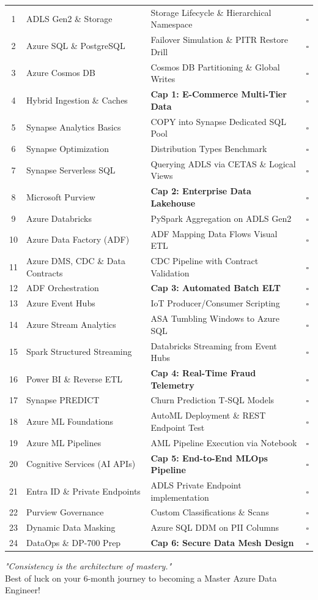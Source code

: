 \documentclass[11pt, a4paper]{article}
\begin{document}
\begin{center}
\begin{longtable}{@{} c l p{7cm} c @{}}
1 & ADLS Gen2 \& Storage & Storage Lifecycle \& Hierarchical Namespace & $\square$ \\
2 & Azure SQL \& PostgreSQL & Failover Simulation \& PITR Restore Drill & $\square$ \\
3 & Azure Cosmos DB & Cosmos DB Partitioning \& Global Writes & $\square$ \\
4 & Hybrid Ingestion \& Caches & \textbf{Cap 1: E-Commerce Multi-Tier Data} & $\square$ \\
\midrule
5 & Synapse Analytics Basics & COPY into Synapse Dedicated SQL Pool & $\square$ \\
6 & Synapse Optimization & Distribution Types Benchmark & $\square$ \\
7 & Synapse Serverless SQL & Querying ADLS via CETAS \& Logical Views & $\square$ \\
8 & Microsoft Purview & \textbf{Cap 2: Enterprise Data Lakehouse} & $\square$ \\
\midrule
9 & Azure Databricks & PySpark Aggregation on ADLS Gen2 & $\square$ \\
10 & Azure Data Factory (ADF) & ADF Mapping Data Flows Visual ETL & $\square$ \\
11 & Azure DMS, CDC \& Data Contracts & CDC Pipeline with Contract Validation & $\square$ \\
12 & ADF Orchestration & \textbf{Cap 3: Automated Batch ELT} & $\square$ \\
\midrule
13 & Azure Event Hubs & IoT Producer/Consumer Scripting & $\square$ \\
14 & Azure Stream Analytics & ASA Tumbling Windows to Azure SQL & $\square$ \\
15 & Spark Structured Streaming & Databricks Streaming from Event Hubs & $\square$ \\
16 & Power BI \& Reverse ETL & \textbf{Cap 4: Real-Time Fraud Telemetry} & $\square$ \\
\midrule
17 & Synapse PREDICT & Churn Prediction T-SQL Models & $\square$ \\
18 & Azure ML Foundations & AutoML Deployment \& REST Endpoint Test & $\square$ \\
19 & Azure ML Pipelines & AML Pipeline Execution via Notebook & $\square$ \\
20 & Cognitive Services (AI APIs)& \textbf{Cap 5: End-to-End MLOps Pipeline} & $\square$ \\
\midrule
21 & Entra ID \& Private Endpoints& ADLS Private Endpoint implementation & $\square$ \\
22 & Purview Governance & Custom Classifications \& Scans & $\square$ \\
23 & Dynamic Data Masking & Azure SQL DDM on PII Columns & $\square$ \\
24 & DataOps \& DP-700 Prep & \textbf{Cap 6: Secure Data Mesh Design} & $\square$ \\

\end{longtable}
\end{center}

\vspace{1cm}
\begin{center}
    \textit{"Consistency is the architecture of mastery."} \\
    Best of luck on your 6-month journey to becoming a Master Azure Data Engineer!
\end{center}
\end{document}
